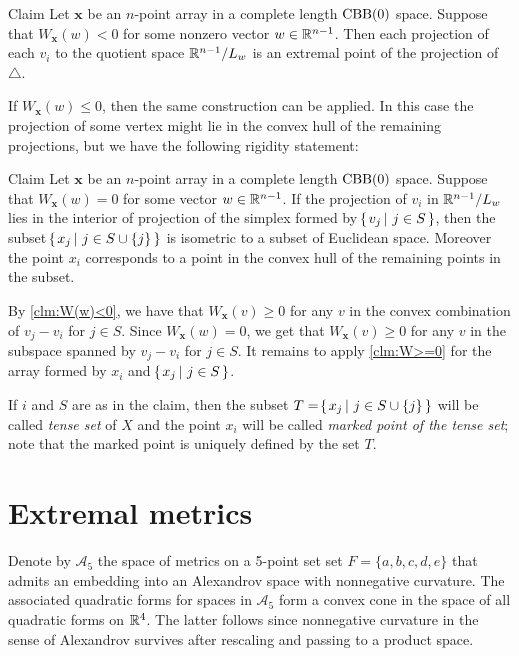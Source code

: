 \documentclass{article}
\begin{document}
\begin{thm}{Claim}\label{clm:W(w)<0}
Let $\bm{x}$ be an $n$-point array in a complete length $\mathrm{CBB}(0)$ space.
Suppose that $W_{\bm{x}}(w)<0$ for some nonzero vector $w\in\mathbb{R}^{n-1}$.
Then each projection of each $v_i$ to the quotient space $\mathbb{R}^{n-1}/L_w$ is an extremal point of the projection of~$\triangle$.
\end{thm}

If $W_{\bm{x}}(w)\le0$, then the same construction can be applied.
In this case the projection of some vertex might lie in the convex hull of the remaining projections,
but we have the following rigidity statement:

\begin{thm}{Claim}\label{clm:W(w)==0}
Let $\bm{x}$ be an $n$-point array in a complete length $\mathrm{CBB}(0)$ space.
Suppose that $W_{\bm{x}}(w)= 0$ for some vector $w\in\mathbb{R}^{n-1}$.
If the projection of $v_i$ in $\mathbb{R}^{n-1}/L_w$ lies in the interior of projection of the simplex formed by $\set{v_j}{j\in S}$,
then the subset $\set{x_j}{j\in S\cup \{j\}}$ is isometric to a subset of Euclidean space.
Moreover the point $x_i$ corresponds to a point in the convex hull of the remaining points in the subset.
\end{thm}

By \ref{clm:W(w)<0}, we have that $W_{\bm{x}}(v)\ge 0$ for any $v$ in the convex combination of $v_j-v_i$ for $j\in S$.
Since $W_{\bm{x}}(w)=0$, we get that $W_{\bm{x}}(v)\ge 0$ for any $v$ in the subspace spanned by $v_j-v_i$ for $j\in S$.
It remains to apply \ref{clm:W>=0} for the array formed by $x_i$ and $\set{x_j}{j\in S}$.
\qeds

If $i$ and $S$ are as in the claim,
then the subset $T=\set{x_j}{j\in S\cup \{j\}}$ will be called \emph{tense set} of $X$ and the point $x_i$ will be called \emph{marked point of the tense set}; note that the marked point is uniquely defined by the set $T$.

\section{Extremal metrics}

Denote by $\mathcal{A}_5$ the space of metrics on a 5-point set set $F=\{a,b,c,d,e\}$ that admits an embedding into an Alexandrov space with nonnegative curvature.
The associated quadratic forms for spaces in $\mathcal{A}_5$ form a convex cone in the space of all quadratic forms on $\mathbb{R}^4$.
The latter follows since nonnegative curvature in the sense of Alexandrov survives after rescaling and passing to a product space.
\end{document}
